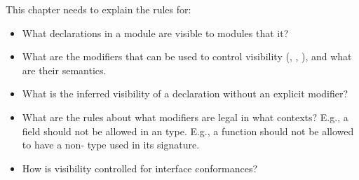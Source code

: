 
\begin{TODO}
This chapter needs to explain the rules for:

\begin{itemize}

\item What declarations in a module are visible to modules that  it?

\item What are the modifiers that can be used to control visibility (, , ), and what are their semantics.

\item What is the inferred visibility of a declaration without an explicit modifier?

\item What are the rules about what modifiers are legal in what contexts?
\subitem E.g., a  field should not be allowed in an  type.
\subitem E.g., a  function should not be allowed to have a non- type used in its signature.

\item How is visibility controlled for interface conformances?

\end{itemize}
\end{TODO}